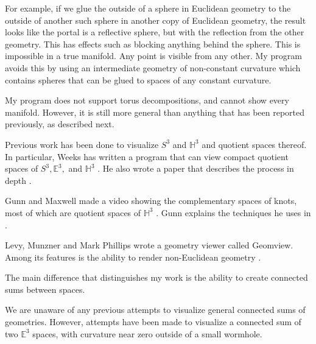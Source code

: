 For example, if we glue the outside of a sphere in Euclidean geometry to the outside of another such sphere in another copy of Euclidean geometry, the result looks like the portal is a reflective sphere, but with the reflection from the other geometry. This has effects such as blocking anything behind the sphere. This is impossible in a true manifold. Any point is visible from any other. My program avoids this by using an intermediate geometry of non-constant curvature which contains spheres that can be glued to spaces of any constant curvature.

My program does not support torus decompositions, and cannot show every manifold. However, it is still more general than anything that has been reported previously, as described next.






Previous work has been done to visualize $S^3$ and $\mathbb{H}^3$ and quotient spaces thereof. In particular, Weeks has written a program that can view compact quotient spaces of $S^3, \mathbb{E}^3,$ and $\mathbb{H}^3$ \cite{CurvedSpaces}. He also wrote a paper that describes the process in depth \cite{CurvedSpacesPaper}.

Gunn and Maxwell made a video showing the complementary spaces of knots, most of which are quotient spaces of $\mathbb{H}^3$ \cite{NotKnot}. Gunn explains the techniques he uses in \cite{CharlieGunn} \cite{CharlieGunn2}.

Levy, Munzner and Mark Phillips wrote a geometry viewer called Geomview. Among its features is the ability to render non-Euclidean geometry \cite{Geomview}.

The main difference that distinguishes my work is the ability to create connected sums between spaces.



We are unaware of any previous attempts to visualize general connected sums of geometries. However, attempts have been made to visualize a connected sum of two $\mathbb{E}^3$ spaces, with curvature near zero outside of a small wormhole.

